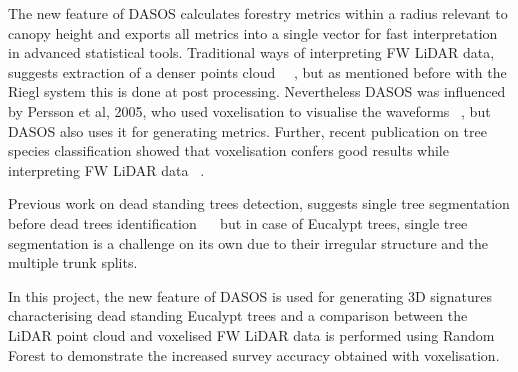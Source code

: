 \documentclass{article}
\begin{document}
The new feature of DASOS calculates forestry metrics within a radius relevant to canopy height and exports all metrics into a single vector for fast interpretation in advanced statistical tools.  Traditional ways of interpreting FW LiDAR data, suggests extraction of a denser points cloud ~\cite{Neuenschwander2009}~\cite{Reitberger2008}, but as mentioned before with the Riegl system this is done at post processing. Nevertheless DASOS was influenced by Persson et al, 2005, who used voxelisation to visualise the waveforms ~\cite{Persson2005}, but DASOS also uses it for generating metrics. Further, recent publication on tree species classification showed that voxelisation confers good results while interpreting FW LiDAR data ~\cite{Cao2016}. 

Previous work on dead standing trees detection, suggests single tree segmentation before dead trees identification ~\cite{Yao2012}~\cite{Polewski2015} but in case of Eucalypt trees, single tree segmentation is a challenge on its own due to their irregular structure and the multiple trunk splits. 

In this project, the new feature of DASOS is used for generating 3D signatures characterising dead standing Eucalypt trees and a comparison between the LiDAR point cloud and voxelised FW LiDAR data is performed using Random Forest to demonstrate the increased survey accuracy obtained with voxelisation.




  \newpage
  
  {}
\thispagestyle{empty}
\end{document}
